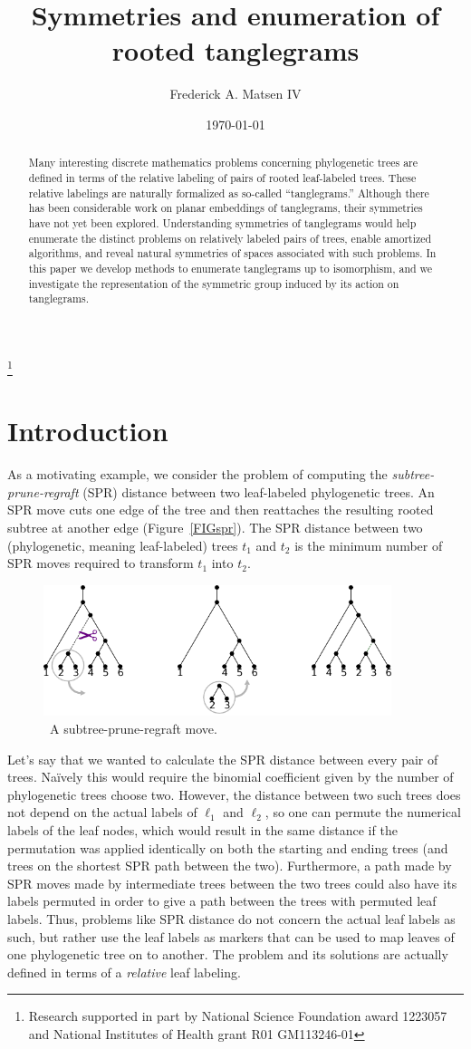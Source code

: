 \documentclass{amsart}
\newcommand{\arxiv}[1]{#1}
\newcommand{\FIGspr}{\
\label{FIGspr}
\begin{figure}
  \arxiv{\includegraphics[width=4in]{figures/spr-definition}}
\caption{\
  A subtree-prune-regraft move.
}
\end{figure}
}
\begin{document}
\title{Symmetries and enumeration of rooted tanglegrams}
\author[Matsen]{Frederick A. Matsen IV}
\address{Fred Hutchinson Cancer Research Center \\ Seattle, WA}
\thanks{Research supported in part by National Science Foundation award 1223057 and National Institutes of Health grant R01 GM113246-01}


\date{\today}

\begin{abstract}
Many interesting discrete mathematics problems concerning phylogenetic trees are defined in terms of the relative labeling of pairs of rooted leaf-labeled trees.
These relative labelings are naturally formalized as so-called ``tanglegrams.''
Although there has been considerable work on planar embeddings of tanglegrams, their symmetries have not yet been explored.
Understanding symmetries of tanglegrams would help enumerate the distinct problems on relatively labeled pairs of trees, enable amortized algorithms, and reveal natural symmetries of spaces associated with such problems.
In this paper we develop methods to enumerate tanglegrams up to isomorphism, and we investigate the representation of the symmetric group induced by its action on tanglegrams.
\end{abstract}

\maketitle


\section{Introduction}
As a motivating example, we consider the problem of computing the \emph{subtree-prune-regraft} (SPR) distance between two leaf-labeled phylogenetic trees.
An SPR move cuts one edge of the tree and then reattaches the resulting rooted subtree at another edge (Figure~\ref{FIGspr}).
The SPR distance between two (phylogenetic, meaning leaf-labeled) trees $t_1$ and $t_2$ is the minimum number of SPR moves required to transform $t_1$ into $t_2$.
\FIGspr

Let's say that we wanted to calculate the SPR distance between every pair of trees.
Na\"ively this would require the binomial coefficient given by the number of phylogenetic trees choose two.
However, the distance between two such trees does not depend on the actual labels of $\ell_1$ and $\ell_2$, so one can permute the numerical labels of the leaf nodes, which would result in the same distance if the permutation was applied identically on both the starting and ending trees (and trees on the shortest SPR path between the two).
Furthermore, a path made by SPR moves made by intermediate trees between the two trees could also have its labels permuted in order to give a path between the trees with permuted leaf labels.
Thus, problems like SPR distance do not concern the actual leaf labels as such, but rather use the leaf labels as markers that can be used to map leaves of one phylogenetic tree on to another.
The problem and its solutions are actually defined in terms of a \emph{relative} leaf labeling.
\end{document}
